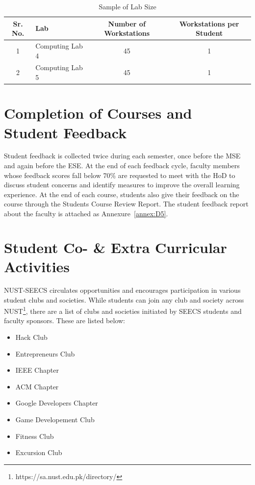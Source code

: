 \begin{table}[H]
\centering
\caption{Sample of Lab Size}
\label{tab:lab-size}
\begin{tabular}{@{}clcc@{}}
\toprule
\textbf{Sr. No.} &
\textbf{Lab} &
\textbf{Number of Workstations} &
\textbf{Workstations per Student} \\
\midrule
1 & Computing Lab 4 & 45 & 1 \\
2 & Computing Lab 5 & 45 & 1 \\
\bottomrule
\end{tabular}
\end{table}

\section{Completion of Courses and Student Feedback}
\label{sec:course-feedback}

Student feedback is collected twice during each semester, once before the MSE and again before the ESE. At the end of each feedback cycle, faculty members whose feedback scores fall below 70\% are requested to meet with the HoD to discuss student concerns and identify measures to improve the overall learning experience. At the end of each course, students also give their feedback on the course through the Students Course Review Report. The student feedback report about the faculty is attached as Annexure~\ref{annex:D5}.

\section{Student Co- \& Extra Curricular Activities}
\label{sec:competitions}
NUST-SEECS circulates opportunities and encourages participation in various student clubs and societies. While students can join any club and society across NUST\footnote{https://sa.nust.edu.pk/directory/}, there are a list of clubs and societies initiated by SEECS students and faculty sponsors. These are listed below:

\begin{itemize}
    \item{Hack Club}
    \item{Entrepreneurs Club}
    \item{IEEE Chapter}
    \item{ACM Chapter}
    \item{Google Developers Chapter}
    \item{Game Developement Club}
    \item{Fitness Club}
    \item{Excursion Club}
\end{itemize}

